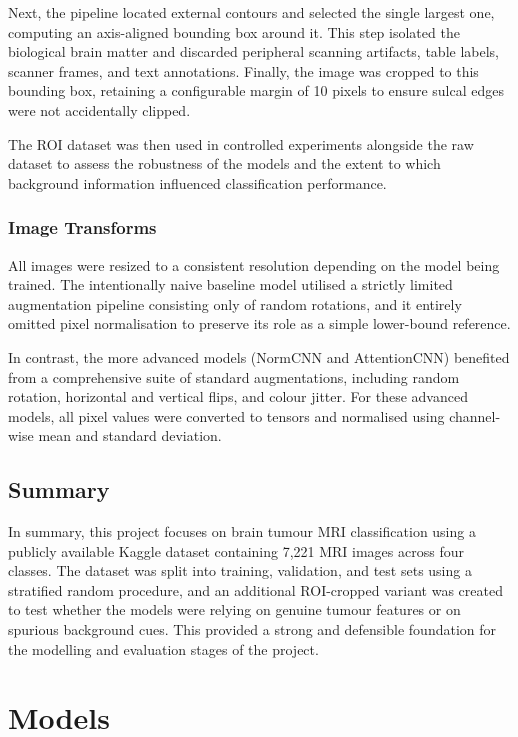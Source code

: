 \documentclass{article}
\begin{document}
Next, the pipeline located external contours and selected the single largest one, computing an axis-aligned bounding box around it. This step isolated the biological brain matter and discarded peripheral scanning artifacts, table labels, scanner frames, and text annotations. Finally, the image was cropped to this bounding box, retaining a configurable margin of 10 pixels to ensure sulcal edges were not accidentally clipped. 

The ROI dataset was then used in controlled experiments alongside the raw dataset to assess the robustness of the models and the extent to which background information influenced classification performance.

\subsubsection{Image Transforms}

All images were resized to a consistent resolution depending on the model being trained. The intentionally naive baseline model utilised a strictly limited augmentation pipeline consisting only of random rotations, and it entirely omitted pixel normalisation to preserve its role as a simple lower-bound reference. 

In contrast, the more advanced models (NormCNN and AttentionCNN) benefited from a comprehensive suite of standard augmentations, including random rotation, horizontal and vertical flips, and colour jitter. For these advanced models, all pixel values were converted to tensors and normalised using channel-wise mean and standard deviation.

\subsection{Summary}

In summary, this project focuses on brain tumour MRI classification using a publicly available Kaggle dataset containing 7,221 MRI images across four classes. The dataset was split into training, validation, and test sets using a stratified random procedure, and an additional ROI-cropped variant was created to test whether the models were relying on genuine tumour features or on spurious background cues. This provided a strong and defensible foundation for the modelling and evaluation stages of the project.

\section{Models}
\end{document}
